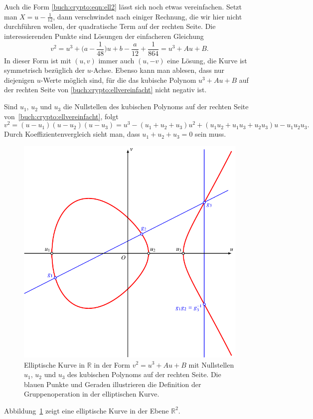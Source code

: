 Auch die Form \eqref{buch:crypto:eqn:ell2} lässt sich noch etwas 
vereinfachen.
Setzt man $X=u-\frac1{12}$, dann verschwindet nach einiger Rechnung,
die wir hier nicht durchführen wollen, der quadratische Term
auf der rechten Seite.
Die interessierenden Punkte sind Lösungen der einfacheren Gleichung
\begin{equation}
v^2
=
u^3+\biggl(a-\frac{1}{48}\biggr)u + b-\frac{a}{12}+\frac{1}{864}
=
u^3+Au+B.
\label{buch:crypto:ellvereinfacht}
\end{equation}
In dieser Form ist mit $(u,v)$ immer auch $(u,-v)$ eine Lösung,
die Kurve ist symmetrisch bezüglich der $u$-Achse.
Ebenso kann man ablesen, dass nur diejenigen $u$-Werte möglich sind,
für die das kubische Polynom $u^3+Au+B$ auf der rechten Seite von
\eqref{buch:crypto:ellvereinfacht}
nicht negativ ist.

Sind $u_1$, $u_2$ und $u_3$ die Nullstellen des kubischen Polynoms
auf der rechten Seite von~\eqref{buch:crypto:ellvereinfacht}, folgt
\[
v^2
=
(u-u_1)(u-u_2)(u-u_3)
=
u^3
-(u_1+u_2+u_3)u^2
+(u_1u_2+u_1u_3+u_2u_3)u
-
u_1u_2u_3.
\]
Durch Koeffizientenvergleich sieht man, dass $u_1+u_2+u_3=0$ sein muss.
\begin{figure}
\centering
\includegraphics{chapters/90-crypto/images/elliptic.pdf}
\caption{Elliptische Kurve in $\mathbb{R}$ in der Form
$v^2=u^3+Au+B$ mit Nullstellen $u_1$, $u_2$ und $u_3$ des
kubischen Polynoms auf der rechten Seite.
Die blauen Punkte und Geraden illustrieren die Definition der
Gruppenoperation in der elliptischen Kurve.
\label{buch:crypto:fig:elliptischekurve}}
\end{figure}
Abbildung~\ref{buch:crypto:fig:elliptischekurve}
zeigt eine elliptische Kurve in der Ebene $\mathbb{R}^2$.

